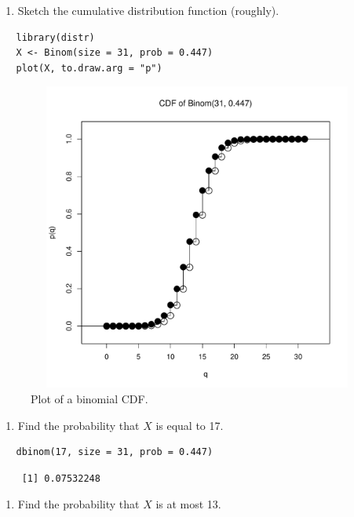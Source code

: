 \documentclass[captions=tableheading]{scrbook}
\begin{document}
\begin{xca}
\begin{enumerate}
\item Sketch the cumulative distribution function (roughly).
\end{enumerate}


\begin{verbatim}
   library(distr)
   X <- Binom(size = 31, prob = 0.447)
   plot(X, to.draw.arg = "p")
\end{verbatim}



   \begin{figure}[ht!]
	  \includegraphics[width=5in, height=4in]{img/binompxca.pdf}
	  \caption[Plot of a binomial CDF]{\small Plot of a binomial CDF.}
	  \label{fig:binompxca}
	\end{figure}

\begin{enumerate}
\item Find the probability that \(X\) is equal to 17.
\end{enumerate}

\begin{verbatim}
   dbinom(17, size = 31, prob = 0.447)
\end{verbatim}

\begin{verbatim}
    [1] 0.07532248
\end{verbatim}

\begin{enumerate}
\item Find the probability that \(X\) is at most 13.
\end{enumerate}


\end{xca}
\end{document}
